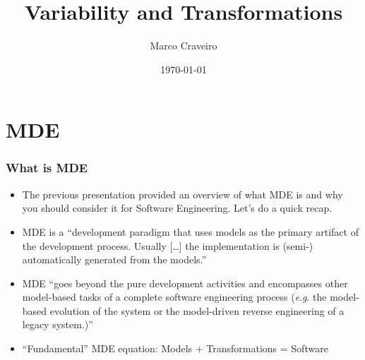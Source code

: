 \documentclass{beamer}
\title{Variability and Transformations}
\author{Marco Craveiro}
\date{\today}
\newcommand{\eg}{\textit{e}.\textit{g}. }
\begin{document}
\begin{frame}

\titlepage{}


\end{frame}

\section{\ac{MDE}}

\begin{frame}
\frametitle{What is \ac{MDE}}

\begin{itemize}
\item The previous presentation provided an overview of what \acf{MDE}
  is and why you should consider it for Software Engineering. Let's do
  a quick recap.

\pause{}

\item \ac{MDE} is a \enquote{development paradigm that uses models as
  the primary artifact of the development process. Usually [\ldots]
  the implementation is (semi-) automatically generated from the
  models.}\cite{brambilla2012model}

\pause{}

\item \ac{MDE} ``goes beyond the pure development activities and
  encompasses other model-based tasks of a complete software
  engineering process (\eg the model-based evolution of the system or
  the model-driven reverse engineering of a legacy
  system.)''\cite{brambilla2012model}

\pause

\item ``Fundamental'' \ac{MDE} equation: Models + Transformations =
  Software

\end{itemize}

\end{frame}
\end{document}
